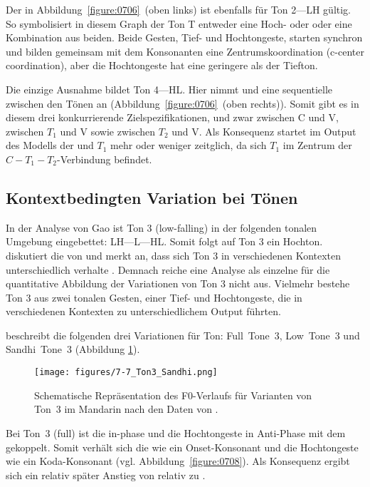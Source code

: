 \largerpage
Der  in Abbildung~\ref{figure:0706}~(oben links) ist ebenfalls für Ton 2---LH gültig. So symbolisiert in diesem Graph der Ton T entweder eine Hoch- oder  oder eine Kombination aus beiden. Beide Gesten, Tief- und Hochtongeste, starten synchron und bilden gemeinsam mit dem Konsonanten eine Zentrumskoordination (c-center coordination), aber die Hochtongeste hat eine geringere  als der Tiefton.

Die einzige Ausnahme bildet Ton 4---HL. Hier nimmt \citet{Gao2006} und \citet{Gao2009} eine sequentielle  zwischen den Tönen an (Abbildung~\ref{figure:0706}~(oben rechts)). Somit gibt es in diesem  drei konkurrierende Zielspezifikationen, und zwar zwischen C und V, zwischen  ${T}_{1}$ und V sowie zwischen  ${T}_{2}$ und V. Als Konsequenz startet im Output des Modells der  und ${T}_{1}$ mehr oder weniger zeitglich, da sich  ${T}_{1}$ im Zentrum der ${C}-{T}_{1}-{T}_{2}$-Verbindung befindet.

\subsection{Kontextbedingten Variation bei Tönen}
\label{subsec:070103}

In der Analyse von Gao ist Ton 3 (low-falling) in der folgenden tonalen Umgebung eingebettet: LH---L---HL. Somit folgt auf Ton 3 ein Hochton. \citet{Hsieh2011} diskutiert die  von \citet{Gao2009} und merkt an, dass sich Ton 3 in verschiedenen Kontexten unterschiedlich verhalte \citep[vgl. auch][]{Xu1997,Cho2011}. Demnach reiche eine Analyse als einzelne  für die quantitative Abbildung der Variationen von Ton 3 nicht aus. Vielmehr bestehe Ton 3 aus zwei tonalen Gesten, einer Tief- und Hochtongeste, die in verschiedenen Kontexten zu unterschiedlichem Output führten.

\citet{Hsieh2011} beschreibt die folgenden drei Variationen für Ton: Full~Tone~3, Low~Tone~3 und Sandhi~Tone~3 (Abbildung \ref{figure:0707}).

\begin{figure}
	\texttt{[image: figures/7-7\_Ton3\_Sandhi.png]}
	\caption{Schematische Repräsentation des F0-Verlaufs für Varianten von Ton~3 im Mandarin nach den Daten von \citet{Hsieh2011}.}
	\label{figure:0707}
\end{figure}

Bei Ton~3 (full) ist die  in-phase und die Hochtongeste in Anti-Phase mit dem  gekoppelt. Somit verhält sich die  wie ein Onset-Konsonant und die Hochtongeste wie ein Koda-Konsonant (vgl. Abbildung~\ref{figure:0708}). Als Konsequenz ergibt sich ein relativ später Anstieg von  relativ zu .

